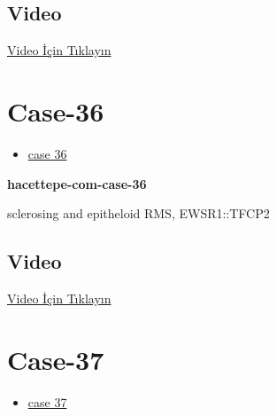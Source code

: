 \documentclass[
  letterpaper,
  DIV=11,
  numbers=noendperiod]{scrreprt}
\providecommand{\tightlist}{%
  \setlength{\itemsep}{0pt}\setlength{\parskip}{0pt}}\usepackage{longtable,booktabs,array}
\begin{document}
\hypertarget{video-33}{%
\subsection{Video}\label{video-33}}

\href{https://www.youtube.com/watch?v=f_rdB9xqpiw}{Video İçin Tıklayın}

\hypertarget{sec-hacettepe-case-of-the-month-case-36}{%
\section{Case-36}\label{sec-hacettepe-case-of-the-month-case-36}}

\begin{itemize}
\tightlist
\item
  \href{https://www.youtube.com/watch?v=ga7KjbH3U1s\&ab_channel=KemalKosemehmetoglu}{case
  36}
\end{itemize}

\textbf{hacettepe-com-case-36}

\begin{tcolorbox}[enhanced jigsaw, colbacktitle=quarto-callout-tip-color!10!white, colback=white, titlerule=0mm, opacityback=0, colframe=quarto-callout-tip-color-frame, opacitybacktitle=0.6, bottomrule=.15mm, breakable, coltitle=black, title=\textcolor{quarto-callout-tip-color}{\faLightbulb}\hspace{0.5em}{Tanı}, toprule=.15mm, toptitle=1mm, bottomtitle=1mm, arc=.35mm, rightrule=.15mm, leftrule=.75mm, left=2mm]

sclerosing and epitheloid RMS, EWSR1::TFCP2

\end{tcolorbox}

\hypertarget{video-34}{%
\subsection{Video}\label{video-34}}

\href{https://www.youtube.com/watch?v=ga7KjbH3U1s}{Video İçin Tıklayın}

\hypertarget{sec-hacettepe-case-of-the-month-case-37}{%
\section{Case-37}\label{sec-hacettepe-case-of-the-month-case-37}}

\begin{itemize}
\tightlist
\item
  \href{https://www.youtube.com/watch?v=H8cnZqL29eI\&ab_channel=KemalKosemehmetoglu}{case
  37}
\end{itemize}
\end{document}

